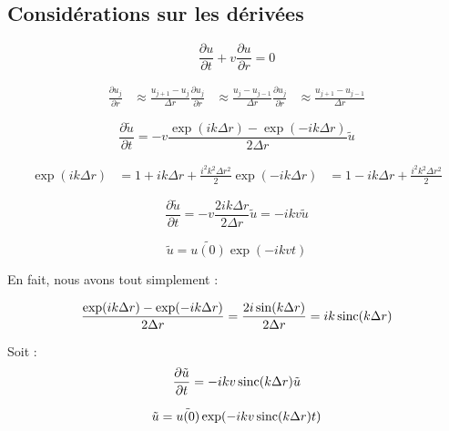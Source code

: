 \subsection{Considérations sur les dérivées}

\begin{equation}
    \frac{\partial u}{\partial t} + v \frac{\partial u}{\partial r} = 0
\end{equation}

\begin{align}
    \frac{\partial u_j}{\partial r} &\approx \frac{u_{j+1} - u_j}{\Delta{r}}
    \frac{\partial u_j}{\partial r} &\approx \frac{u_j - u_{j-1}}{\Delta{r}}
    \frac{\partial u_j}{\partial r} &\approx \frac{u_{j+1} - u_{j-1}}{\Delta{r}}
\end{align}

\begin{equation}
    \frac{\partial \tilde{u}}{\partial t} = - v \frac{\exp(ik\Delta{r}) - \exp(-ik\Delta{r})}{2 \Delta{r}} \tilde{u}
\end{equation}

\begin{align}
    \exp(ik\Delta{r}) &= 1 + ik\Delta{r} + \frac{i^2 k^2 \Delta{r}^2}{2}
    \exp(-ik\Delta{r}) &= 1 - ik\Delta{r} + \frac{i^2 k^2 \Delta{r}^2}{2}
\end{align}

\begin{equation}
    \frac{\partial \tilde{u}}{\partial t} = - v \frac{2ik\Delta{r}}{2\Delta{r}} \tilde{u} = - i k v \tilde{u}
\end{equation}

\begin{equation}
    \tilde{u} = \tilde{u(0)} \exp(-i k v t)
\end{equation}

En fait, nous avons tout simplement :

\begin{equation}
    \frac{\exp(ik\Delta{r}) - \exp(-ik\Delta{r})}{2 \Delta{r}} = \frac{2 i \sin(k\Delta{r})}{2 \Delta{r}} = i k \operatorname{sinc}(k\Delta{r})
\end{equation}

Soit :
\begin{equation}
    \frac{\partial \tilde{u}}{\partial t} = - i k v \operatorname{sinc}(k\Delta{r}) \tilde{u}
\end{equation}

\begin{equation}
    \tilde{u} = \tilde{u(0)} \exp(-i k v \operatorname{sinc}(k \Delta{r}) t)
\end{equation}

